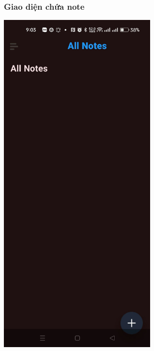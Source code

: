 \documentclass[a4paper,12pt]{article}
\begin{document}
\subsubsection{Giao diện chứa note}
\includegraphics[width=0.6\textwidth]{GiaoDienChuanote.png}
\clearpage
\end{document}
